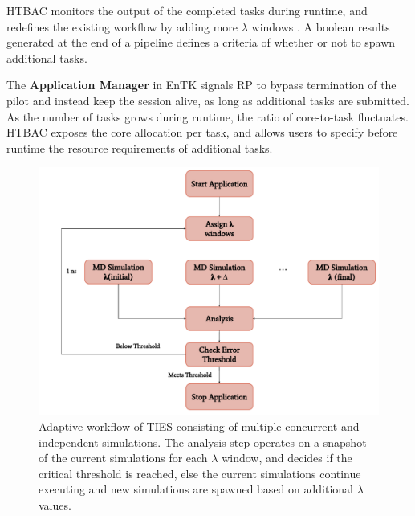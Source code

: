 HTBAC monitors the output of the completed tasks during runtime, and
redefines the existing workflow by adding more $\lambda$ windows . A boolean results generated
at the end of a pipeline defines a criteria of whether or not
 to spawn additional
tasks.


The \textbf{Application Manager} in EnTK signals RP to bypass termination of
the pilot and instead keep the session alive, as long as additional tasks are
submitted. As the number of tasks grows during runtime, the ratio of
core-to-task fluctuates. HTBAC exposes the core allocation per task, and
allows users to specify before runtime the resource requirements of
additional tasks.

\begin{figure}
  \centering
  \includegraphics[width=\columnwidth]{figures/adaptive_TIES_workflow_diagram.pdf}
  \caption{Adaptive workflow of TIES consisting of multiple concurrent and
  independent simulations. The analysis step operates on a snapshot of the
  current simulations for each $\lambda$ window, and decides if the critical
  threshold is reached, else the current simulations continue executing and
  new simulations are spawned based on additional $\lambda$ values.}
\label{fig:adaptive_ties}
\end{figure}

